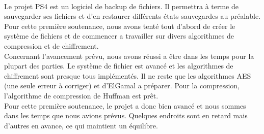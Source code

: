 \paragraph*{}
Le projet PS4 est un logiciel de backup de fichiers. Il permettra à terme de sauvegarder ses fichiers et d'en restaurer différents états sauvegardes au préalable. Pour cette première soutenance, nous avons tenté tout d'abord de créer le système de fichiers et de commencer a travailler sur divers algorithmes de compression et de chiffrement. \\
Concernant l'avancement prévu, nous avons réussi a être dans les temps pour la plupart des parties. Le système de fichier est avancé et les algorithmes de chiffrement sont presque tous implémentés. Il ne reste que les algorithmes AES (une seule erreur à corriger) et d'ElGamal a préparer. Pour la compression, l'algorithme de compression de Huffman est prêt.\\
Pour cette première soutenance, le projet a donc bien avancé et nous sommes dans les temps que nous avions prévus. Quelques endroits sont en retard mais d'autres en avance, ce qui maintient un équilibre. 